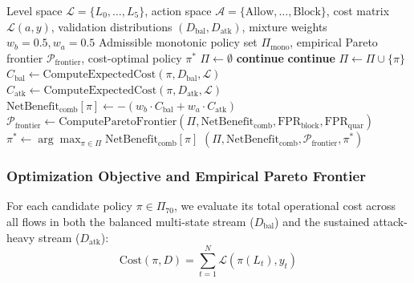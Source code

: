 \documentclass[journal,10pt,onecolumn]{IEEEtran}
\begin{document}
\begin{algorithm}[t]
\caption{Decision-Theoretic Combinatorial Monotonic Policy Evaluation and Pareto Analysis}
\label{alg:policy_opt}
\begin{algorithmic}[1]
\Require Level space $\mathcal{L} = \{L_0, \dots, L_5\}$, action space $\mathcal{A} = \{\text{Allow}, \dots, \text{Block}\}$, cost matrix $\mathcal{L}(a, y)$, validation distributions $(D_{\text{bal}}, D_{\text{atk}})$, mixture weights $w_b=0.5, w_a=0.5$
\Ensure Admissible monotonic policy set $\Pi_{\text{mono}}$, empirical Pareto frontier $\mathcal{P}_{\text{frontier}}$, cost-optimal policy $\pi^*$
\State $\Pi \leftarrow \emptyset$
 
        \State \textbf{continue} 
    \EndIf
        \State \textbf{continue} 
    \EndIf
    \State $\Pi \leftarrow \Pi \cup \{\pi\}$ 
\EndFor
{} 
    \State $C_{\text{bal}} \leftarrow \text{ComputeExpectedCost}(\pi, D_{\text{bal}}, \mathcal{L})$
    \State $C_{\text{atk}} \leftarrow \text{ComputeExpectedCost}(\pi, D_{\text{atk}}, \mathcal{L})$
    \State $\text{NetBenefit}_{\text{comb}}[\pi] \leftarrow -(w_b \cdot C_{\text{bal}} + w_a \cdot C_{\text{atk}})$
\EndFor
\State $\mathcal{P}_{\text{frontier}} \leftarrow \text{ComputeParetoFrontier}(\Pi, \text{NetBenefit}_{\text{comb}}, \text{FPR}_{\text{block}}, \text{FPR}_{\text{quar}})$
\State $\pi^* \leftarrow \arg\max_{\pi \in \Pi} \text{NetBenefit}_{\text{comb}}[\pi]$ 
\State \Return $(\Pi, \text{NetBenefit}_{\text{comb}}, \mathcal{P}_{\text{frontier}}, \pi^*)$
\end{algorithmic}
\end{algorithm}


\subsubsection{Optimization Objective and Empirical Pareto Frontier}
For each candidate policy $\pi \in \Pi_{70}$, we evaluate its total operational cost across all flows in both the balanced multi-state stream ($D_{\text{bal}}$) and the sustained attack-heavy stream ($D_{\text{atk}}$):
$$\text{Cost}(\pi, D) = \sum_{t=1}^N \mathcal{L}(\pi(L_t), y_t)$$
\end{document}
